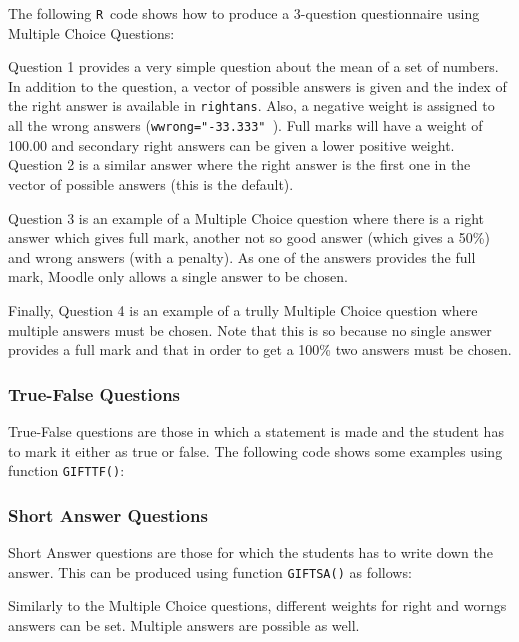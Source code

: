 \documentclass[a4paper]{article}
\newcommand{\RR}{\texttt{R}\ }
\newcommand{\code}[1]{\texttt{#1}}
\begin{document}
The following \RR code shows how to produce a 3-question questionnaire
using Multiple Choice Questions:




Question 1 provides a very simple question about the mean of a set of numbers.
In addition to the question, a vector of possible answers is given and the
index of the right answer is available in \code{rightans}. Also, a negative
weight is assigned to all the wrong answers (\code{wwrong="-33.333" }).
Full marks will have a weight of 100.00 and secondary right answers
can be given a lower positive weight.
Question 2 is a similar answer where the right answer is the first one in the
vector of possible answers (this is the default).  

Question 3 is an example of a Multiple Choice question where there is a right
answer which gives full mark, another not so good answer (which gives a 50\%)
and wrong answers (with a penalty).  As one of the answers provides the full
mark, Moodle only allows a single answer to be chosen.

Finally, Question 4 is an example of a trully Multiple Choice question where
multiple answers must be chosen. Note that this is so because no single answer
provides a full mark and that in order to get a 100\% two answers must be
chosen.

\subsubsection{True-False Questions}

True-False questions are those in which a statement is made and the student has
to mark it either as true or false. The following code shows some examples
using function \code{GIFTTF()}:




\subsubsection{Short Answer Questions}

Short Answer questions are those for which the students has to write down the 
answer. This can be produced using function \code{GIFTSA()} as follows:



Similarly to the Multiple Choice questions, different weights for right and
worngs answers can be set. Multiple answers are possible as well.
\end{document}
